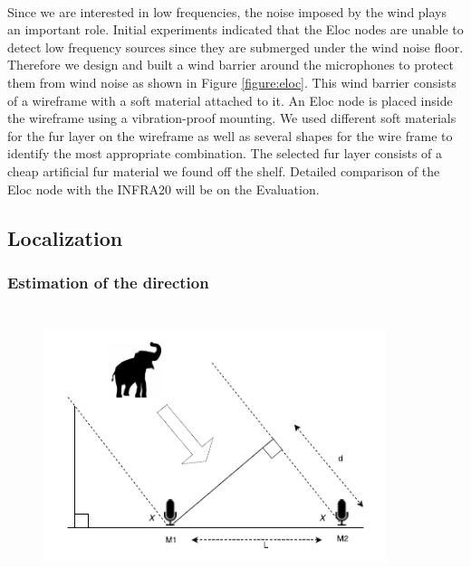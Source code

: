\documentclass[12pt]{article}
\numberwithin{figure}{section}
\numberwithin{table}{section}
\begin{document}
\paragraph{}
Since we are interested in low frequencies, the noise imposed by the wind plays an important role. Initial experiments indicated that the Eloc nodes are unable to detect low frequency sources since they are submerged under the wind noise floor. Therefore we design and built a wind barrier around the microphones to protect them from wind noise as shown in Figure \ref{figure:eloc}. This wind barrier consists of a wireframe with a soft material attached to it. An Eloc node is placed inside the wireframe using a vibration-proof mounting. We used different soft materials for the fur layer on the wireframe as well as several shapes for the wire frame to identify the most appropriate combination. The selected fur layer consists of a cheap artificial fur material we found off the shelf. Detailed comparison of the Eloc node with the INFRA20 will be on the Evaluation.


\subsection{Localization}

\subsubsection{Estimation of the direction}

\begin{figure}[H]
\centering
\includegraphics[width=100mm,height=80mm]{direction.png}
\label{direction1}
\end{figure}
\paragraph{}
\end{document}
